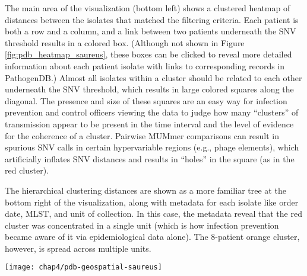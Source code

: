 The main area of the visualization (bottom left) shows a clustered heatmap of distances between the isolates that matched the filtering criteria. Each patient is both a row and a column, and a link between two patients underneath the SNV threshold results in a colored box. (Although not shown in Figure \ref{fig:pdb_heatmap_saureus}, these boxes can be clicked to reveal more detailed information about each patient isolate with links to corresponding records in PathogenDB.) Almost all isolates within a cluster should be related to each other underneath the SNV threshold, which results in large colored squares along the diagonal. The presence and size of these squares are an easy way for infection prevention and control officers viewing the data to judge how many ``clusters'' of transmission appear to be present in the time interval and the level of evidence for the coherence of a cluster. Pairwise MUMmer comparisons can result in spurious SNV calls in certain hypervariable regions (e.g., phage elements), which artificially inflates SNV distances and results in ``holes'' in the square (as in the red cluster).

The hierarchical clustering distances are shown as a more familiar tree at the bottom right of the visualization, along with metadata for each isolate like order date, MLST, and unit of collection. In this case, the metadata reveal that the red cluster was concentrated in a single unit (which is how infection prevention became aware of it via epidemiological data alone). The 8-patient orange cluster, however, is spread across multiple units.

\begin{sidewaysfigure}[hp]
  \sidewaysvspace
  \centering
  \texttt{[image: chap4/pdb-geospatial-saureus]}               
\end{sidewaysfigure}

